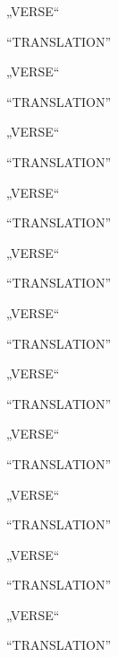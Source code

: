 \bva „VERSE“\eva

\bvb “TRANSLATION”\evb
\evg


\bva „VERSE“\eva

\bvb “TRANSLATION”\evb
\evg


\bva „VERSE“\eva

\bvb “TRANSLATION”\evb
\evg


\bva „VERSE“\eva

\bvb “TRANSLATION”\evb
\evg


\bva „VERSE“\eva

\bvb “TRANSLATION”\evb
\evg


\bva „VERSE“\eva

\bvb “TRANSLATION”\evb
\evg


\bva „VERSE“\eva

\bvb “TRANSLATION”\evb
\evg


\bva „VERSE“\eva

\bvb “TRANSLATION”\evb
\evg


\bva „VERSE“\eva

\bvb “TRANSLATION”\evb
\evg


\bva „VERSE“\eva

\bvb “TRANSLATION”\evb
\evg


\bva „VERSE“\eva

\bvb “TRANSLATION”\evb
\evg
